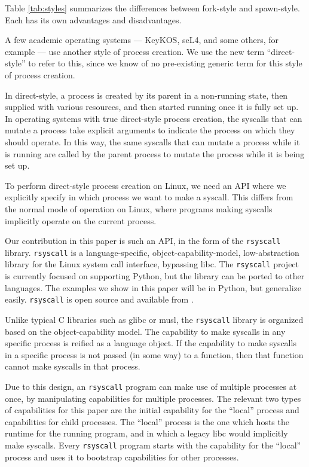 \documentclass[letterpaper,twocolumn,10pt]{article}
\begin{document}
Table \ref{tab:styles} summarizes the differences between fork-style and spawn-style.
Each has its own advantages and disadvantages.

A few academic operating systems --- KeyKOS, seL4, and some others, for example ---
use another style of process creation.\cite{keykos}\cite{sel4}\cite{exokernel}\cite{fuchsia}\cite{singularity}
We use the new term ``direct-style'' to refer to this,
since we know of no pre-existing generic term for this style of process creation.

In direct-style, a process is created by its parent in a non-running state,
then supplied with various resources,
and then started running once it is fully set up.
In operating systems with true direct-style process creation,
the syscalls that can mutate a process
take explicit arguments to indicate the process on which they should operate.\cite{keykos}\cite{sel4}
In this way, the same syscalls that can mutate a process while it is running
are called by the parent process to mutate the process while it is being set up.

To perform direct-style process creation on Linux,
we need an API where we explicitly specify in which process we want to make a syscall.
This differs from the normal mode of operation on Linux,
where programs making syscalls implicitly operate on the current process.

Our contribution in this paper is such an API, in the form of the \texttt{rsyscall} library.
\texttt{rsyscall} is a
language-specific, object-capability-model, low-abstraction library for the Linux system call interface,
bypassing libc.\cite{capmyths}\cite{robust_composition}
The \texttt{rsyscall} project is currently focused on supporting Python,
but the library can be ported to other languages.
The examples we show in this paper will be in Python,
but generalize easily.
\texttt{rsyscall} is open source and available from
\githuburl{}.

Unlike typical C libraries such as glibc or musl,
the \texttt{rsyscall} library is organized based on the object-capability model.\cite{capmyths}
The capability to make syscalls in any specific process is reified as a language object.
If the capability to make syscalls in a specific process is not passed (in some way) to a function,
then that function cannot make syscalls in that process.

Due to this design, an \texttt{rsyscall} program can make use of multiple processes at once,
by manipulating capabilities for multiple processes.
The relevant two types of capabilities for this paper are the initial capability for the ``local'' process
and capabilities for child processes.
The ``local'' process is the one which hosts the runtime for the running program,
and in which a legacy libc would implicitly make syscalls.
Every \texttt{rsyscall} program starts with the capability for the ``local'' process
and uses it to bootstrap capabilities for other processes.
\end{document}
